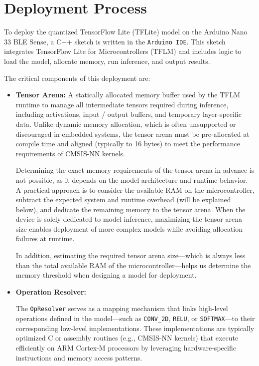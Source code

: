 \section{Deployment Process}
\label{sec:DeploymentProcess}
To deploy the quantized TensorFlow Lite (TFLite) model on the Arduino Nano 33 BLE Sense, a C++ sketch is written in the \texttt{Arduino IDE}. This sketch integrates TensorFlow Lite for Microcontrollers (TFLM) and includes logic to load the model, allocate memory, run inference, and output results. 

The critical components of this deployment are:

\begin{itemize}
    \item \textbf{Tensor Arena:} 
    A statically allocated memory buffer used by the TFLM runtime to manage all intermediate tensors required during inference, including activations, input / output buffers, and temporary layer-specific data. Unlike dynamic memory allocation, which is often unsupported or discouraged in embedded systems, the tensor arena must be pre-allocated at compile time and aligned (typically to 16 bytes) to meet the performance requirements of CMSIS-NN kernels.
    
    Determining the exact memory requirements of the tensor arena in advance is not possible, as it depends on the model architecture and runtime behavior. A practical approach is to consider the available RAM on the microcontroller, subtract the expected system and runtime overhead (will be explained below), and dedicate the remaining memory to the tensor arena. When the device is solely dedicated to model inference, maximizing the tensor arena size enables deployment of more complex models while avoiding allocation failures at runtime.

    In addition, estimating the required tensor arena size—which is always less than the total available RAM of the microcontroller—helps us determine the memory threshold when designing a model for deployment.

  \item \textbf{Operation Resolver:} 
    {\sloppy
    The \texttt{OpResolver} serves as a mapping mechanism that links high-level operations defined in the model—such as \texttt{CONV\_2D}, \texttt{RELU}, or \texttt{SOFTMAX}—to their corresponding low-level implementations. These implementations are typically optimized C or assembly routines (e.g., CMSIS-NN kernels) that execute efficiently on ARM Cortex-M processors by leveraging hardware-specific instructions and memory access patterns.
    \par}



\end{itemize}

